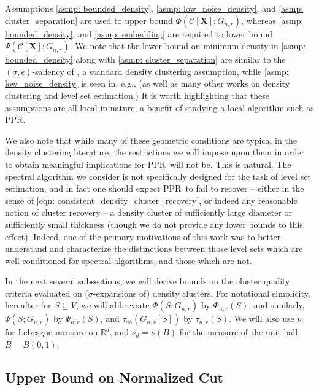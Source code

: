 \documentclass{article}
\newcommand{\Reals}{\mathbb{R}}
\newcommand{\Rd}{\Reals^d}
\newcommand{\1}{\mathbf{1}}
\newcommand{\Xbf}{\mathbf{X}}
\newcommand{\Cset}{\mathcal{C}}
\newcommand{\ppr}{{\sc PPR}}
\newcommand{\pprspace}{{\sc PPR~}}
\theoremstyle{aldenthm}
\theoremstyle{aldenrmrk}
\begin{document}
Assumptions \ref{asmp: bounded_density}, \ref{asmp: low_noise_density},
and \ref{asmp: cluster_separation} are used to upper bound $\Phi(\Cset[\Xbf];
G_{n,r})$, whereas \ref{asmp: bounded_density}, and \ref{asmp: embedding} are required to lower bound $\Psi(\Cset[\Xbf]; G_{n,r})$. We note that the
lower bound on minimum density in \ref{asmp: bounded_density} along with \ref{asmp:  
cluster_separation} are similar to the $(\sigma,\epsilon)$-saliency of
\citep{chaudhuri2010}, a standard density clustering assumption, while
\ref{asmp: low_noise_density} is seen in, e.g., \citep{singh2009} (as well as
many other works on density clustering and level set estimation.)  It is worth
highlighting that these assumptions are all local in nature, a benefit of
studying a local algorithm such as \ppr.



We also note that while many of these geometric conditions are typical in the density clustering literature, the restrictions we will impose upon them in order to obtain meaningful implications for \pprspace will not be. This is natural. The spectral algorithm we consider is not specifically designed for the task of level set estimation, and in fact one should expect \pprspace to fail to recover -- either in the sense of \eqref{eqn: consistent_density_cluster_recovery}, or indeed any reasonable notion of cluster recovery -- a density cluster of sufficiently large diameter or sufficiently small thickness (though we do not provide any lower bounds to this effect). Indeed, one of the primary motivations of this work was to better understand and characterize the distinctions between those level sets which are well conditioned for spectral algorithms, and those which are not.


In the next several subsections, we will derive bounds on the cluster quality
criteria evaluated on ($\sigma$-expansions of) density clusters. For notational simplicity,
hereafter for $S \subseteq V$, we will abbreviate $\Phi(S; G_{n,r})$ by
$\Phi_{n,r}(S)$, and similarly, $\Psi(S; G_{n,r})$ by $\Psi_{n,r}(S)$, and
$\tau_{\infty}(G_{n,r}[S])$ by $\tau_{n,r}(S)$. We will also use $\nu$ for
Lebesgue measure on $\Rd$, and $\nu_d = \nu(B)$ for the measure of the unit ball
$B=B(0,1)$.  

\subsection{Upper Bound on Normalized Cut}
\end{document}
